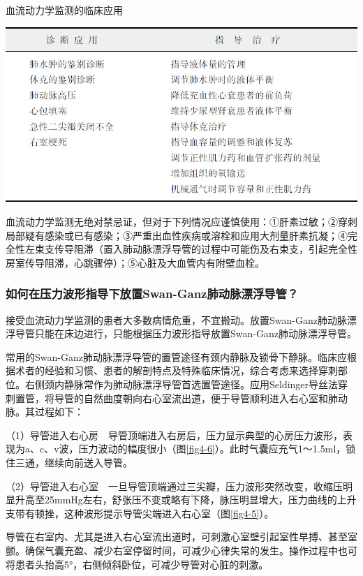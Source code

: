 \begin{table}[htbp]
\centering
\caption{血流动力学监测的临床应用}
\label{tab4-1}
\includegraphics{./images/Image00032.jpg}
\end{table}

血流动力学监测无绝对禁忌证，但对于下列情况应谨慎使用：①肝素过敏；②穿刺局部疑有感染或已有感染；③严重出血性疾病或溶栓和应用大剂量肝素抗凝；④完全性左束支传导阻滞（置入肺动脉漂浮导管的过程中可能伤及右束支，引起完全性房室传导阻滞，心跳骤停）；⑤心脏及大血管内有附壁血栓。

\subsubsection{如何在压力波形指导下放置Swan-Ganz肺动脉漂浮导管？}

接受血流动力学监测的患者大多数病情危重，不宜搬动。放置Swan-Ganz肺动脉漂浮导管只能在床边进行，只能根据压力波形指导放置Swan-Ganz肺动脉漂浮导管。

常用的Swan-Ganz肺动脉漂浮导管的置管途径有颈内静脉及锁骨下静脉。临床应根据术者的经验和习惯、患者的解剖特点及特殊临床情况，综合考虑来选择穿刺部位。右侧颈内静脉常作为肺动脉漂浮导管首选置管途径。应用Seldinger导丝法穿刺置管，将导管的自然曲度朝向右心室流出道，便于导管顺利进入右心室和肺动脉。其过程如下：

（1）导管进入右心房　导管顶端进入右房后，压力显示典型的心房压力波形，表现为a、c、v波，压力波动的幅度很小（图\ref{fig4-6}）。此时气囊应充气1～1.5ml，锁住三通，继续向前送入导管。

（2）导管进入右心室　一旦导管顶端通过三尖瓣，压力波形突然改变，收缩压明显升高至25mmHg左右，舒张压不变或略有下降，脉压明显增大，压力曲线的上升支带有顿挫，这种波形提示导管尖端进入右心室（图\ref{fig4-5}）。

导管在右室内、尤其是进入右心室流出道时，可刺激心室壁引起室性早搏、甚至室颤。确保气囊充盈、减少右室停留时间，可减少心律失常的发生。操作过程中也可将患者头抬高5°，右侧倾斜卧位，可减少导管对心脏的刺激。

